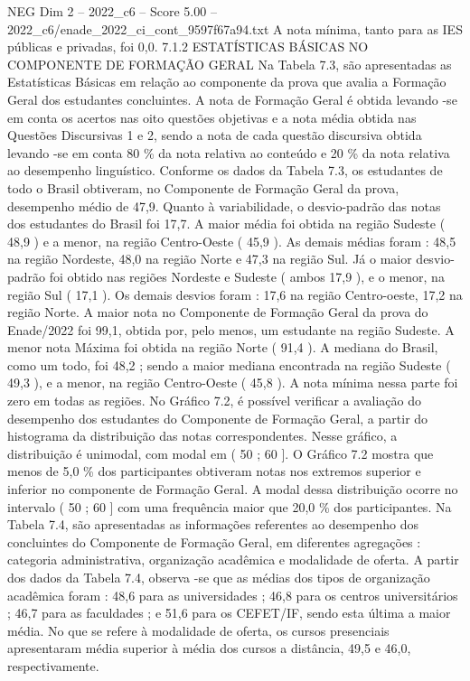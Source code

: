 \begin{textsample}{NEG Dim 2 – 2022\_c6 – Score 5.00 – 2022\_c6/enade\_2022\_ci\_cont\_9597f67a94.txt}
A nota mínima, tanto para as IES públicas e privadas, foi 0,0. 7.1.2 ESTATÍSTICAS BÁSICAS NO COMPONENTE DE FORMAÇÃO GERAL Na Tabela 7.3, são apresentadas as Estatísticas Básicas em relação ao componente da prova que avalia a Formação Geral dos estudantes concluintes.
A nota de Formação Geral é obtida levando -se em conta os acertos nas oito questões objetivas e a nota média obtida nas Questões Discursivas 1 e 2, sendo a nota de cada questão discursiva obtida levando -se em conta 80 \% da nota relativa ao conteúdo e 20 \% da nota relativa ao desempenho linguístico.
Conforme os dados da Tabela 7.3, os estudantes de todo o Brasil obtiveram, no Componente de Formação Geral da prova, desempenho médio de 47,9.
Quanto à variabilidade, o desvio-padrão das notas dos estudantes do Brasil foi 17,7.
A maior média foi obtida na região Sudeste ( 48,9 ) e a menor, na região Centro-Oeste ( 45,9 ).
As demais médias foram : 48,5 na região Nordeste, 48,0 na região Norte e 47,3 na região Sul.
Já o maior desvio-padrão foi obtido nas regiões Nordeste e Sudeste ( ambos 17,9 ), e o menor, na região Sul ( 17,1 ).
Os demais desvios foram : 17,6 na região Centro-oeste, 17,2 na região Norte.
A maior nota no Componente de Formação Geral da prova do Enade/2022 foi 99,1, obtida por, pelo menos, um estudante na região Sudeste.
A menor nota Máxima foi obtida na região Norte ( 91,4 ).
A mediana do Brasil, como um todo, foi 48,2 ; sendo a maior mediana encontrada na região Sudeste ( 49,3 ), e a menor, na região Centro-Oeste ( 45,8 ).
A nota mínima nessa parte foi zero em todas as regiões.
No Gráfico 7.2, é possível verificar a avaliação do desempenho dos estudantes do Componente de Formação Geral, a partir do histograma da distribuição das notas correspondentes.
Nesse gráfico, a distribuição é unimodal, com modal em ( 50 ; 60 ].
O Gráfico 7.2 mostra que menos de 5,0 \% dos participantes obtiveram notas nos extremos superior e inferior no componente de Formação Geral.
A modal dessa distribuição ocorre no intervalo ( 50 ; 60 ] com uma frequência maior que 20,0 \% dos participantes.
Na Tabela 7.4, são apresentadas as informações referentes ao desempenho dos concluintes do Componente de Formação Geral, em diferentes agregações : categoria administrativa, organização acadêmica e modalidade de oferta.
A partir dos dados da Tabela 7.4, observa -se que as médias dos tipos de organização acadêmica foram : 48,6 para as universidades ; 46,8 para os centros universitários ; 46,7 para as faculdades ; e 51,6 para os CEFET/IF, sendo esta última a maior média.
No que se refere à modalidade de oferta, os cursos presenciais apresentaram média superior à média dos cursos a distância, 49,5 e 46,0, respectivamente.

\end{textsample}
